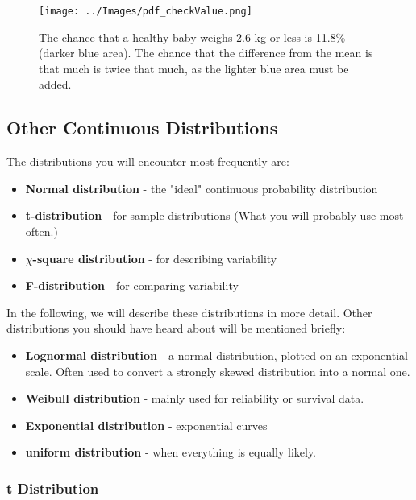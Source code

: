 \begin{figure}
  \centering
  \texttt{[image: ../Images/pdf\_checkValue.png]}\\
  \caption{The chance that a healthy baby weighs 2.6 kg or less is 11.8\% (darker blue area). The chance that the difference from the mean is that much is twice that much, as the lighter blue area must be added.}\label{fig:pdf_checkValue}
\end{figure}

\subsection{Other Continuous Distributions}\label{sec:ContinuousDistributions} 

The distributions you will encounter most frequently are:

\begin{itemize}
  \item \textbf{Normal distribution} - the "ideal" continuous probability distribution
  \item \textbf{t-distribution} - for sample distributions (What you will probably use most often.)
  \item \textbf{$\chi$-square distribution} - for describing  variability
  \item \textbf{F-distribution} - for comparing variability
\end{itemize}

In the following, we will describe these distributions in more detail. Other distributions you should have heard about will be mentioned briefly:

\begin{itemize}
  \item \textbf{Lognormal distribution} - a normal distribution, plotted on an exponential scale. Often used to convert a strongly skewed distribution into a normal one.
  \item \textbf{Weibull distribution} - mainly used for reliability or survival data.
  \item \textbf{Exponential distribution} - exponential curves
  \item \textbf{uniform distribution} - when everything is equally likely.
\end{itemize}

\subsubsection{t Distribution}

